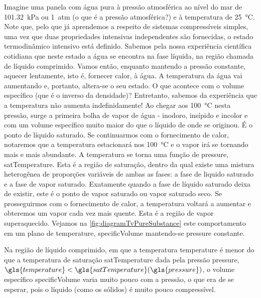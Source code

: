     Imagine uma panela com água pura à pressão atmosférica ao nível do mar de
    \SI{101.32}{\kilo\pascal} ou \SI{1}{atm} (o que é a pressão atmosférica?) e
    à temperatura de \SI{25}{\celsius}. Note que, pelo que já aprendemos a
    respeito de sistemas compressíveis simples, uma vez que duas propriedades
    intensivas independentes são fornecidas, o estado termodinâmico intensivo
    está definido. Sabemos pela nossa experiência científica cotidiana que
    neste estado a água se encontra na fase líquida, na região chamada de
    líquido comprimido. Vamos então, enquanto mantendo a pressão constante,
    aquecer lentamente, isto é, fornecer calor, à água. A temperatura da água
    vai aumentando e, portanto, altera-se o seu estado. O que acontece com o
    volume específico (que é o inverso da densidade)?  Entretanto, sabemos da
    experiência que a temperatura não aumenta indefinidamente! Ao chegar aos
    \SI{100}{\celsius} nesta pressão, surge a primeira bolha de vapor de água -
    inodoro, insípido e incolor  e com um volume específico muito maior do que
    o líquido de onde se originou. É o ponto de líquido saturado. Se
    continuarmos com o fornecimento de calor, notaremos que a temperatura
    estacionará nos \SI{100}{\celsius} e o vapor irá se tornando mais e mais
    abundante. A temperatura se torna uma função de \gls{pressure},
    \gls{satTemperature}. Esta é a região de
    saturação, dentro da qual existe uma mistura heterogênea de proporções
    variáveis de ambas as fases: a fase de liquido saturado e a fase de vapor
    saturado. Exatamente quando a fase de líquido saturado deixa de existir,
    este é o ponto de vapor saturado ou vapor saturado seco. Se prosseguirmos
    com o fornecimento de calor, a temperatura voltará a aumentar e obteremos
    um vapor cada vez mais quente. Esta é a região de vapor superaquecido.
    Vejamos na \cref{fig:diagramTvPureSubstance} este comportamento em um
    plano de \gls{temperature}, \gls{specificVolume} mantendo-se \gls{pressure}
    constante.

    Na região de líquido comprimido, em que a temperatura \gls{temperature} é
    menor do que a temperatura de saturação \gls{satTemperature} dada
    pela pressão \gls{pressure}, $\gls{temperature} <
    \gls{satTemperature}\functionOf{\gls{pressure}}$, o volume
    específico
    \gls{specificVolume} varia
    muito pouco com a pressão, o que era de se esperar, pois o líquido (como os
    sólidos) é muito pouco compressível.

